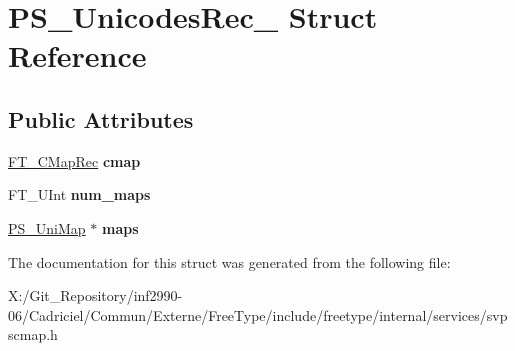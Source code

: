 \hypertarget{struct_p_s___unicodes_rec__}{\section{P\-S\-\_\-\-Unicodes\-Rec\-\_\- Struct Reference}
\label{struct_p_s___unicodes_rec__}
}
\subsection*{Public Attributes}
\begin{DoxyCompactItemize}
\item 
\hypertarget{struct_p_s___unicodes_rec___a4c3e28cb86c8a7039107437dcf995da7}{\hyperlink{struct_f_t___c_map_rec__}{F\-T\-\_\-\-C\-Map\-Rec} {\bfseries cmap}}\label{struct_p_s___unicodes_rec___a4c3e28cb86c8a7039107437dcf995da7}

\item 
\hypertarget{struct_p_s___unicodes_rec___abbc3617f13363ddcf851ee229752b08d}{F\-T\-\_\-\-U\-Int {\bfseries num\-\_\-maps}}\label{struct_p_s___unicodes_rec___abbc3617f13363ddcf851ee229752b08d}

\item 
\hypertarget{struct_p_s___unicodes_rec___abd0ff1abe19a2a6a838b631ec81d22cd}{\hyperlink{struct_p_s___uni_map__}{P\-S\-\_\-\-Uni\-Map} $\ast$ {\bfseries maps}}\label{struct_p_s___unicodes_rec___abd0ff1abe19a2a6a838b631ec81d22cd}

\end{DoxyCompactItemize}


The documentation for this struct was generated from the following file\-:\begin{DoxyCompactItemize}
\item 
X\-:/\-Git\-\_\-\-Repository/inf2990-\/06/\-Cadriciel/\-Commun/\-Externe/\-Free\-Type/include/freetype/internal/services/svpscmap.\-h\end{DoxyCompactItemize}
